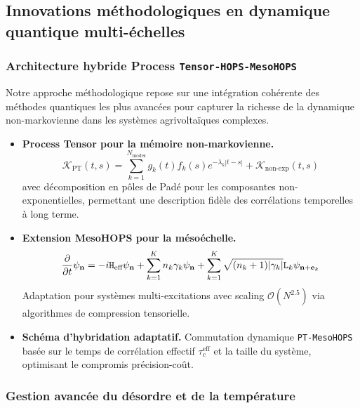 \documentclass[12pt, a4paper]{article}
\begin{document}
\subsection{Innovations méthodologiques en dynamique quantique multi-échelles}

\subsubsection{Architecture hybride Process \texttt{Tensor-HOPS-MesoHOPS}}

Notre approche méthodologique repose sur une intégration cohérente des méthodes quantiques les plus avancées pour capturer la richesse de la dynamique non-markovienne dans les systèmes agrivoltaïques complexes.

\begin{itemize}
    \item \textbf{Process Tensor pour la mémoire non-markovienne.} 
    \begin{equation}
    \mathcal{K}_{\text{PT}}(t,s) = \sum_{k=1}^{N_{\text{modes}}} g_k(t) f_k(s) e^{-\lambda_k |t-s|} + \mathcal{K}_{\text{non-exp}}(t,s)
    \end{equation}
    avec décomposition en pôles de Padé pour les composantes non-exponentielles, permettant une description fidèle des corrélations temporelles à long terme.
    
    \item \textbf{Extension MesoHOPS pour la mésoéchelle.}
    \begin{equation}
    \pdv{t} \psi_{\mathbf{n}} = -i\mathtt{H}_{\text{eff}}\psi_{\mathbf{n}} + \sum_{k=1}^K n_k\gamma_k\psi_{\mathbf{n}} + \sum_{k=1}^K \sqrt{(n_k+1)|\gamma_k|} \mathtt{L}_k\psi_{\mathbf{n}+\mathbf{e}_k}
    \end{equation}
    Adaptation pour systèmes multi-excitations avec scaling $\mathcal{O}(N^{2.5})$ via algorithmes de compression tensorielle.
    
    \item \textbf{Schéma d'hybridation adaptatif.} Commutation dynamique \texttt{PT-MesoHOPS} basée sur le temps de corrélation effectif $\tau_c^{\text{eff}}$ et la taille du système, optimisant le compromis précision-coût.
\end{itemize}

\subsubsection{Gestion avancée du désordre et de la température}
\end{document}
